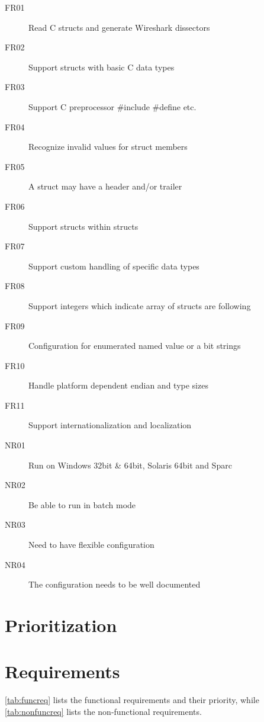 \begin{description}
    \item[FR01] Read C structs and generate Wireshark dissectors
	\item[FR02] Support structs with basic C data types
	\item[FR03] Support C preprocessor \#include \#define etc.
	\item[FR04] Recognize invalid values for struct members
	\item[FR05] A struct may have a header and/or trailer
	\item[FR06] Support structs within structs
	\item[FR07] Support custom handling of specific data types
	\item[FR08] Support integers which indicate array of structs are following
	\item[FR09] Configuration for enumerated named value or a bit strings
	\item[FR10] Handle platform dependent endian and type sizes
	\item[FR11] Support internationalization and localization
	\item[NR01] Run on Windows 32bit \& 64bit, Solaris 64bit and Sparc
	\item[NR02] Be able to run in batch mode
	\item[NR03] Need to have flexible configuration
	\item[NR04] The configuration needs to be well documented
\end{description}


\chapter{Prioritization}


\chapter{Requirements}
\label{chap:requirements}
\autoref{tab:funcreq} lists the functional requirements and their priority,
while \autoref{tab:nonfuncreq} lists the non-functional requirements.

